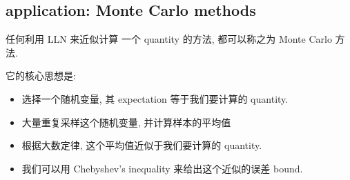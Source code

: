 \subsection{application: Monte Carlo methods}\label{application-monte-carlo-methods}

任何利用 LLN 来近似计算 一个 quantity 的方法, 都可以称之为 Monte Carlo 方法.

它的核心思想是:

\begin{itemize}
\item
  选择一个随机变量, 其 expectation 等于我们要计算的 quantity.
\item
  大量重复采样这个随机变量, 并计算样本的平均值
\item
  根据大数定律, 这个平均值近似于我们要计算的 quantity.
\item
  我们可以用 Chebyshev's inequality 来给出这个近似的误差 bound.
\end{itemize}

